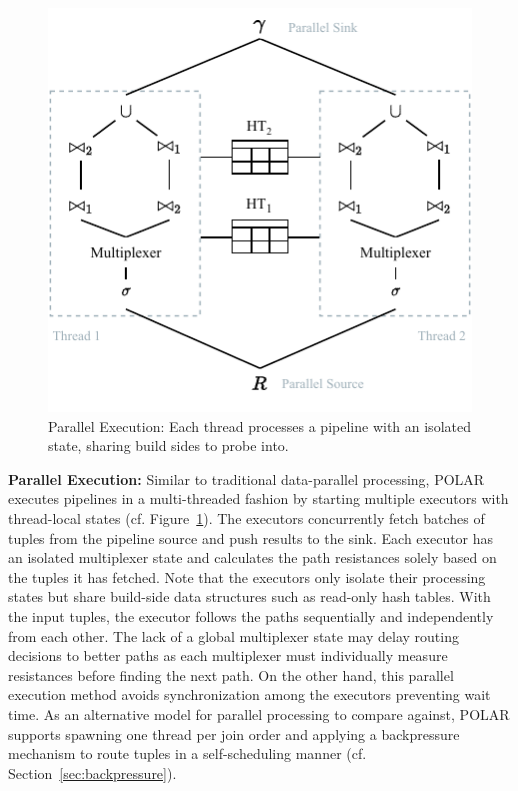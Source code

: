 \begin{figure}
    \centering
    \includegraphics[width=0.9\linewidth]{figures/parallel-exec.pdf}
    \vspace{-0.5cm}
    \caption{Parallel Execution: Each thread processes a pipeline with an isolated state, sharing build sides to probe into.}
    \vspace{-0.25cm}
    \label{fig:parallel-exec}
\end{figure}

\textbf{Parallel Execution:} Similar to traditional data-parallel processing, POLAR executes pipelines in a multi-threaded fashion by starting multiple executors with thread-local states (cf. Figure~\ref{fig:parallel-exec}). The executors concurrently fetch batches of tuples from the pipeline source and push results to the sink. Each executor has an isolated multiplexer state and calculates the path resistances solely based on the tuples it has fetched. Note that the executors only isolate their processing states but share build-side data structures such as read-only hash tables. With the input tuples, the executor follows the paths sequentially and independently from each other. The lack of a global multiplexer state may delay routing decisions to better paths as each multiplexer must individually measure resistances before finding the next path. On the other hand, this parallel execution method avoids synchronization among the executors preventing wait time. As an alternative model for parallel processing to compare against, POLAR supports spawning one thread per join order and applying a backpressure mechanism to route tuples in a self-scheduling manner (cf. Section~\ref{sec:backpressure}).


